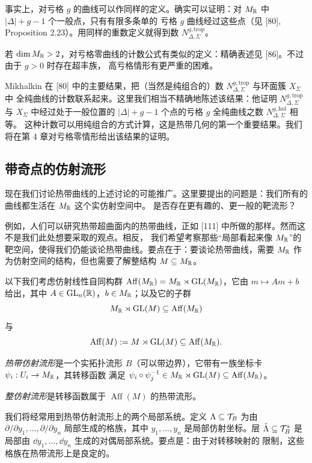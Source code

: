 事实上，对亏格 $g$ 的曲线可以作同样的定义。确实可以证明：对 $M_{\mathbb{R}}$ 中 $|\Delta|+g-1$ 个一般点，只有有限多条单的
亏格 $g$ 曲线经过这些点（见 [80], Proposition 2.23）。用同样的重数定义就得到数
$N^{g,\mathrm{trop}}_{\Delta,\Sigma}$。

若 $\dim M_{\mathbb{R}} > 2$，对亏格零曲线的计数公式有类似的定义：精确表述见 [86]。不过由于 $g>0$ 时存在超丰族，
高亏格情形有更严重的困难。

Mikhalkin 在 [80] 中的主要结果，把（当然是纯组合的）数 $N^{g,\mathrm{trop}}_{\Delta,\Sigma}$ 与环面簇 $X_\Sigma$ 中
全纯曲线的计数联系起来。这里我们相当不精确地陈述该结果：他证明 $N^{g,\mathrm{trop}}_{\Delta,\Sigma}$ 与
$X_\Sigma$ 中经过处于一般位置的 $|\Delta|+g-1$ 个点的亏格 $g$ 全纯曲线之数 $N^{g,\mathrm{hol}}_{\Delta,\Sigma}$ 相等。
这种计数可以用纯组合的方式计算，这是热带几何的第一个重要结果。我们将在第 4 章对亏格零情形给出该结果的证明。

\subsection{带奇点的仿射流形}
现在我们讨论热带曲线的上述讨论的可能推广。这里要提出的问题是：我们所有的曲线都生活在 $M_{\mathbb{R}}$ 这个实仿射空间中。
是否存在更有趣的、更一般的靶流形？

例如，人们可以研究热带超曲面内的热带曲线，正如 [111] 中所做的那样。然而这不是我们此处想要采取的观点。相反，
我们希望考察那些“局部看起来像 $M_{\mathbb{R}}$”的靶空间，使得我们仍能谈论热带曲线。要点在于：要谈论热带曲线，需要
$M_{\mathbb{R}}$ 作为仿射空间的结构，但也需要了解整结构 $M \subseteq M_{\mathbb{R}}$。

以下我们考虑仿射线性自同构群 $\operatorname{Aff}(M_{\mathbb{R}}) = M_{\mathbb{R}} \rtimes \mathrm{GL}(M_{\mathbb{R}})$，它由
$m \mapsto Am + b$ 给出，其中 $A \in \mathrm{GL}_n(\mathbb{R})$，$b \in M_{\mathbb{R}}$；以及它的子群
\[
M_{\mathbb{R}} \rtimes \mathrm{GL}(M) \subseteq \operatorname{Aff}(M_{\mathbb{R}})
\]
与
\[
\operatorname{Aff}(M) := M \rtimes \mathrm{GL}(M) \subseteq \operatorname{Aff}(M_{\mathbb{R}}).
\]

\begin{definition}
\emph{热带仿射流形}是一个实拓扑流形 $B$（可以带边界），它带有一族坐标卡 $\psi_i : U_i \to M_{\mathbb{R}}$，其转移函数
满足 $\psi_i \circ \psi_j^{-1} \in M_{\mathbb{R}} \rtimes \mathrm{GL}(M) \subseteq \operatorname{Aff}(M_{\mathbb{R}})$。

\emph{整仿射流形}是转移函数属于 $\operatorname{Aff}(M)$ 的热带流形。
\end{definition}

我们将经常用到热带仿射流形上的两个局部系统。定义 $\Lambda \subseteq \mathcal{T}_B$ 为由
$\partial/\partial y_1,\dots,\partial/\partial y_n$ 局部生成的格族，其中 $y_1,\dots,y_n$ 是局部仿射坐标。层
$\check{\Lambda} \subseteq \mathcal{T}^*_B$ 是局部由 $\dd y_1,\dots,\dd y_n$ 生成的对偶局部系统。要点是：由于对转移映射的
限制，这些格族在热带流形上是良定的。

